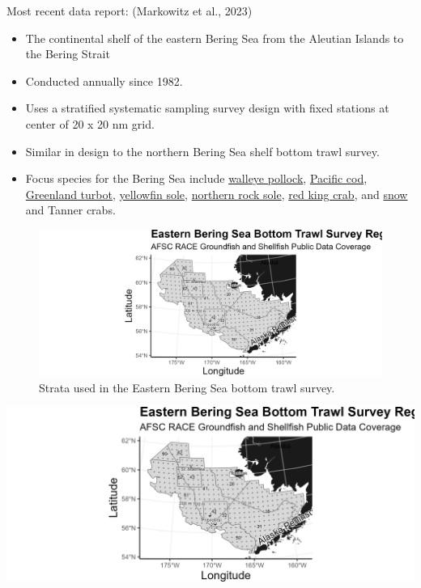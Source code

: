\documentclass[
  letterpaper,
  oneside,
  open=any]{scrbook}
\providecommand{\tightlist}{%
  \setlength{\itemsep}{0pt}\setlength{\parskip}{0pt}}\usepackage{longtable,booktabs,array}
\begin{document}
Most recent data report: (Markowitz et al., 2023)

\begin{itemize}
\tightlist
\item
  The continental shelf of the eastern Bering Sea from the Aleutian
  Islands to the Bering Strait
\item
  Conducted annually since 1982.
\item
  Uses a stratified systematic sampling survey design with fixed
  stations at center of 20 x 20 nm grid.
\item
  Similar in design to the northern Bering Sea shelf bottom trawl
  survey.
\item
  Focus species for the Bering Sea include
  \href{https://www.fisheries.noaa.gov/species/alaska-pollock}{walleye
  pollock},
  \href{https://www.fisheries.noaa.gov/species/pacific-cod}{Pacific
  cod},
  \href{https://www.fisheries.noaa.gov/species/greenland-turbot}{Greenland
  turbot},
  \href{https://www.fisheries.noaa.gov/species/yellowfin-sole}{yellowfin
  sole},
  \href{https://www.fisheries.noaa.gov/species/rock-sole}{northern rock
  sole}, \href{https://www.fisheries.noaa.gov/species/red-king-crab}{red
  king crab}, and
  \href{https://www.fisheries.noaa.gov/species/alaska-snow-crab}{snow}
  and Tanner crabs.
\end{itemize}

\begin{figure}

{\centering \includegraphics[width=7in,height=\textheight]{content/../img/survey_plot_ebs.png}

}

\caption{Strata used in the Eastern Bering Sea bottom trawl survey.}

\end{figure}

\includegraphics[width=7in,height=\textheight]{content/../img/survey_plot_ebs.png}
\end{document}
